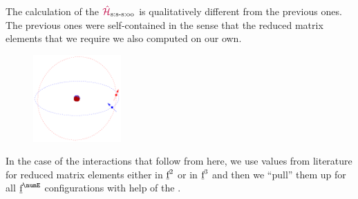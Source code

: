 \documentclass[11pt, twoside,openright]{article}
\begin{document}
	The calculation of the $\textcolor{purple}{\textcolor{purple}{\hat{\mathcal{H}}}}_{\text{s:s-s:oo}}$ is qualitatively different from the previous ones. The previous ones were self-contained in the sense that the reduced matrix elements that we require we also computed on our own. 
	\begin{figure}
\centering
	\includegraphics[width=0.3\textwidth]{./figures/ss-soo.pdf}
\end{figure}
	In the case of the interactions that follow from here, we use values from literature for reduced matrix elements either in $\underbar{\text{f}}^2$ or in $\underbar{\text{f}}^3$ and then we ``pull'' them up for all $\forb^{\numE}$ configurations with help of the \cfps.
\end{document}
